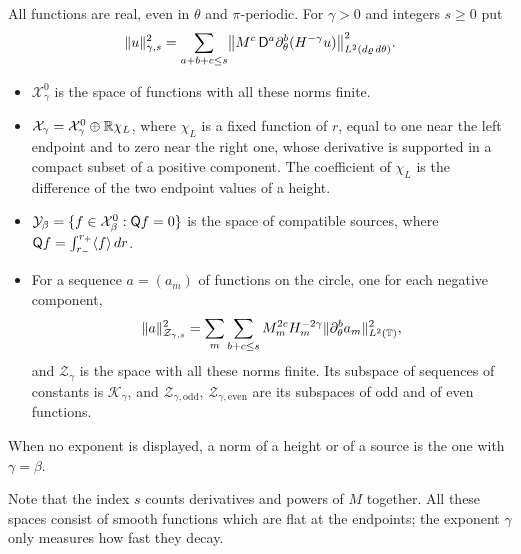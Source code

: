 \begin{definition}
\label{def:readable-physical-grading}
All functions are real, even in $\theta$ and $\pi$-periodic. For
$\gamma>0$ and integers $s\ge0$ put
\begin{equation}\label{eq:full-physical-norm}
 \|u\|_{\gamma,s}^2
 =\sum_{a+b+c\le s}\bigl\|M^c\,\mathsf D^a\partial_\theta^b
                  (H^{-\gamma}u)\bigr\|_{L^2(d\varrho\,d\theta)}^2 .
\end{equation}
\begin{itemize}
\item $\mathcal X^0_\gamma$ is the space of functions with all these
 norms finite.
\item $\mathcal X_\gamma=\mathcal X^0_\gamma\oplus\mathbb R\chi_L$, where
 $\chi_L$ is a fixed function of $r$, equal to one near the left
 endpoint and to zero near the right one, whose derivative is
 supported in a compact subset of a positive component. The
 coefficient of $\chi_L$ is the difference of the two endpoint values
 of a height.
\item $\mathcal Y_\beta=\{f\in\mathcal X^0_\beta:\mathsf Q f=0\}$ is the
 space of compatible sources, where
 $\mathsf Q f=\int_{r_-}^{r_+}\langle f\rangle\,dr$.
\item For a sequence $a=(a_m)$ of functions on the circle, one for
 each negative component,
 \begin{equation}\label{eq:weak-circle-spaces}
  \|a\|_{\mathcal Z_{\gamma,s}}^2
  =\sum_m\sum_{b+c\le s}M_m^{2c}H_m^{-2\gamma}
                    \|\partial_\theta^b a_m\|_{L^2(\mathbb T)}^2 ,
 \end{equation}
 and $\mathcal Z_\gamma$ is the space with all these norms finite.
 Its subspace of sequences of constants is $\mathcal K_\gamma$, and
 $\mathcal Z_{\gamma,\mathrm{odd}}$, $\mathcal Z_{\gamma,\mathrm{even}}$
 are its subspaces of odd and of even functions.
\end{itemize}
When no exponent is displayed, a norm of a height or of a source is
the one with $\gamma=\beta$.
\end{definition}

Note that the index $s$ counts derivatives and powers of $M$
together. All these spaces consist of smooth functions which are flat
at the endpoints; the exponent $\gamma$ only measures how fast they
decay.

